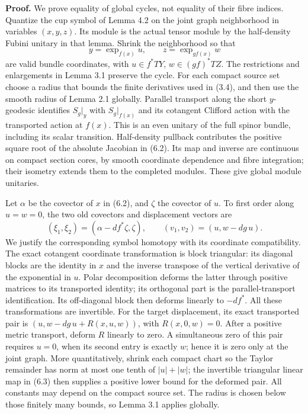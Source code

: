 \documentclass[
  11pt,
]{article}
\begin{document}
\textbf{Proof.} We prove equality of global cycles, not equality of
their fibre indices. Quantize the cup symbol of Lemma 4.2 on the joint
graph neighborhood in variables \((x,y,z)\). Its module is the actual
tensor module by the half-density Fubini unitary in that lemma. Shrink
the neighborhood so that \[
 y=\exp_{f(x)}u,\qquad z=\exp_{gf(x)}w
 \tag{6.2}
\] are valid bundle coordinates, with \(u\in f^*TY\), \(w\in (gf)^*TZ\).
The restrictions and enlargements in Lemma 3.1 preserve the cycle. For
each compact source set choose a radius that bounds the finite
derivatives used in (3.4), and then use the smooth radius of Lemma 2.1
globally. Parallel transport along the short \(y\)-geodesic identifies
\(S_g|_y\) with \(S_g|_{f(x)}\) and its cotangent Clifford action with
the transported action at \(f(x)\). This is an even unitary of the full
spinor bundle, including its scalar transition. Half-density pullback
contributes the positive square root of the absolute Jacobian in (6.2).
Its map and inverse are continuous on compact section cores, by smooth
coordinate dependence and fibre integration; their isometry extends them
to the completed modules. These give global module unitaries.

Let \(\alpha\) be the covector of \(x\) in (6.2), and \(\zeta\) the
covector of \(u\). To first order along \(u=w=0\), the two old covectors
and displacement vectors are \[
 (\xi_1,\xi_2)=(\alpha-df^*\zeta,\zeta),\qquad
 (v_1,v_2)=(u,w-dg\,u).
 \tag{6.3}
\] We justify the corresponding symbol homotopy with its coordinate
compatibility. The exact cotangent coordinate transformation is block
triangular: its diagonal blocks are the identity in \(x\) and the
inverse transpose of the vertical derivative of the exponential in
\(u\). Polar decomposition deforms the latter through positive matrices
to its transported identity; its orthogonal part is the
parallel-transport identification. Its off-diagonal block then deforms
linearly to \(-df^*\). All these transformations are invertible. For the
target displacement, its exact transported pair is
\((u,w-dg\,u+R(x,u,w))\), with \(R(x,0,w)=0\). After a positive metric
transport, deform \(R\) linearly to zero. A simultaneous zero of this
pair requires \(u=0\), when its second entry is exactly \(w\); hence it
is zero only at the joint graph. More quantitatively, shrink each
compact chart so the Taylor remainder has norm at most one tenth of
\(|u|+|w|\); the invertible triangular linear map in (6.3) then supplies
a positive lower bound for the deformed pair. All constants may depend
on the compact source set. The radius is chosen below those finitely
many bounds, so Lemma 3.1 applies globally.
\end{document}
